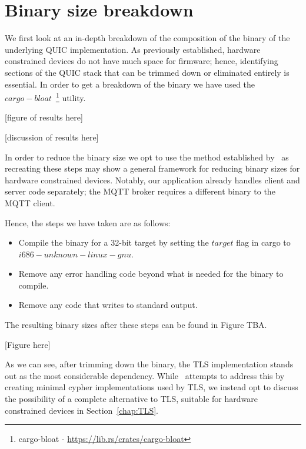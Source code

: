 \section{Binary size breakdown} \label{sec:binary_sizes}

We first look at an in-depth breakdown of the composition of the binary of the underlying QUIC implementation.
As previously established, hardware constrained devices do not have much space for firmware; hence, identifying sections of the QUIC stack that can be trimmed down or eliminated entirely is essential.
In order to get a breakdown of the binary we have used the $cargo-bloat$~\footnote{cargo-bloat - \url{https://lib.rs/crates/cargo-bloat}} utility.

[figure of results here]

[discussion of results here]

In order to reduce the binary size we opt to use the method established by~\citet{eggert_towards_2020} as recreating these steps may show a general framework for reducing binary sizes for hardware constrained devices.
Notably, our application already handles client and server code separately; the MQTT broker requires a different binary to the MQTT client.

Hence, the steps we have taken are as follows:

\begin{itemize}
    \item Compile the binary for a 32-bit target by setting the $target$ flag in cargo to $i686-unknown-linux-gnu$.
    \item Remove any error handling code beyond what is needed for the binary to compile.
    \item Remove any code that writes to standard output.
\end{itemize}

The resulting binary sizes after these steps can be found in Figure TBA.

[Figure here]

As we can see, after trimming down the binary, the TLS implementation stands out as the most considerable dependency.
While~\cite{eggert_towards_2020} attempts to address this by creating minimal cypher implementations used by TLS, we instead opt to discuss the possibility of a complete alternative to TLS, suitable for hardware constrained devices in Section~\ref{chap:TLS}.
